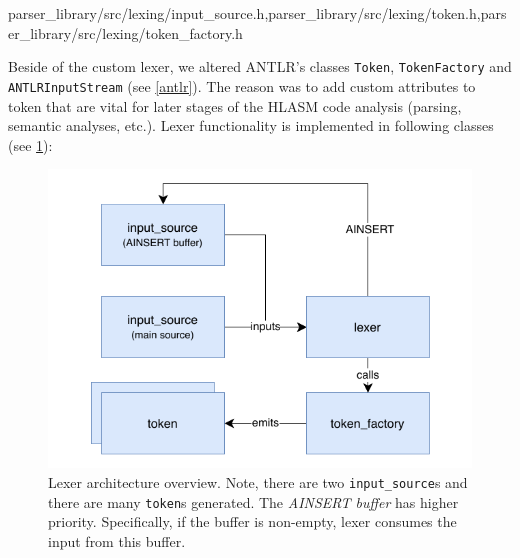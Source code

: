 {parser\_library/src/lexing/input\_source.h,parser\_library/src/lexing/token.h,parser\_library/src/lexing/token\_factory.h}

Beside of the custom lexer, we altered ANTLR's classes \texttt{Token}, \texttt{TokenFactory} and \texttt{ANTLRInputStream} (see \cref{antlr}). The reason was to add custom attributes to token that are vital for later stages of the HLASM code analysis (parsing, semantic analyses, etc.). Lexer functionality is implemented in following classes (see \cref{lexer_arch}):

\begin{figure}
	\centering
	\includegraphics{img/lexer_arch}
	\caption{Lexer architecture overview. Note, there are two \texttt{input\_source}s and there are many \texttt{token}s
		 generated. The \emph{AINSERT buffer} has higher priority. Specifically, if the buffer is non-empty, lexer consumes the input from this buffer. }
	 \label{lexer_arch}
\end{figure}

